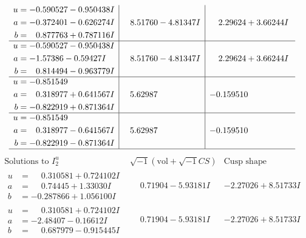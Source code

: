 \documentclass[1p]{elsarticle_modified}
\theoremstyle{definition}
\newcommand{\I}{\sqrt{-1}}
\begin{document}
$$\begin{array}{c|c|c}
\begin{aligned}
u &= -0.590527 - 0.950438 I \\
a &= -0.372401 - 0.626274 I \\
b &= \phantom{-}0.877763 + 0.787116 I\end{aligned}
 & \phantom{-}8.51760 - 4.81347 I & \phantom{-}2.29624 + 3.66244 I \\ \hline\begin{aligned}
u &= -0.590527 - 0.950438 I \\
a &= -1.57386 - 0.59427 I \\
b &= \phantom{-}0.814494 - 0.963779 I\end{aligned}
 & \phantom{-}8.51760 - 4.81347 I & \phantom{-}2.29624 + 3.66244 I \\ \hline\begin{aligned}
u &= -0.851549\phantom{ +0.000000I} \\
a &= \phantom{-}0.318977 + 0.641567 I \\
b &= -0.822919 + 0.871364 I\end{aligned}
 & \phantom{-}5.62987\phantom{ +0.000000I} & -0.159510\phantom{ +0.000000I} \\ \hline\begin{aligned}
u &= -0.851549\phantom{ +0.000000I} \\
a &= \phantom{-}0.318977 - 0.641567 I \\
b &= -0.822919 - 0.871364 I\end{aligned}
 & \phantom{-}5.62987\phantom{ +0.000000I} & -0.159510\phantom{ +0.000000I}\\
 \hline 
 \end{array}$$\newpage$$\begin{array}{c|c|c}  
\text{Solutions to }I^u_{2}& \I (\text{vol} + \sqrt{-1}CS) & \text{Cusp shape}\\
 \hline 
\begin{aligned}
u &= \phantom{-}0.310581 + 0.724102 I \\
a &= \phantom{-}0.74445 + 1.33030 I \\
b &= -0.287866 + 1.056100 I\end{aligned}
 & \phantom{-}0.71904 - 5.93181 I & -2.27026 + 8.51733 I \\ \hline\begin{aligned}
u &= \phantom{-}0.310581 + 0.724102 I \\
a &= -2.48407 - 0.16612 I \\
b &= \phantom{-}0.687979 - 0.915445 I\end{aligned}
 & \phantom{-}0.71904 - 5.93181 I & -2.27026 + 8.51733 I \\ \hline\begin{aligned}

\end{aligned}
\end{array}$$
\end{document}
